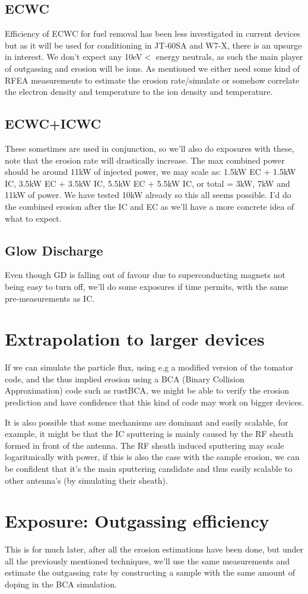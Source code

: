 \documentclass{article}
\begin{document}
\subsection{ECWC}
Efficiency of ECWC for fuel removal has been less investigated in current
devices but as it will be used for conditioning in JT-60SA and W7-X, there is
an upsurge in interest. We don't expect any 10eV$<$ energy neutrals, as such
the main player of outgassing and erosion will be ions.  As mentioned we either
need some kind of RFEA measurements to estimate the erosion rate/simulate or somehow
correlate the electron density and temperature to the ion density and
temperature.
\subsection{ECWC+ICWC}
These sometimes are used in conjunction, so we'll also do exposures with these,
note that the erosion rate will drastically increase. The max combined power
should be around 11kW of injected power, we may scale as: 1.5kW EC + 1.5kW IC,
3.5kW EC + 3.5kW IC, 5.5kW EC + 5.5kW IC, or total = 3kW, 7kW and 11kW of
power. We have tested 10kW already so this all seems possible.  I'd do the
combined erosion after the IC and EC as we'll have a more concrete idea of what
to expect.
\subsection{Glow Discharge}
Even though GD is falling out of favour due to superconducting magnets not
being easy to turn off, we'll do some exposures if time permits, with the same
pre-measurements as IC.
\section{Extrapolation to larger devices}
If we can simulate the particle flux, using e.g a modified version of the
tomator code, and the thus implied erosion using a BCA (Binary Collision
Approximation) code such as rustBCA, we might be able to verify the erosion
prediction and have confidence that this kind of code may work on
bigger devices.

It is also possible that some mechanisms are dominant and easily scalable, for
example, it might be that the IC sputtering is mainly caused by the RF sheath
formed in front of the antenna.  The RF sheath induced sputtering may scale
logaritmically with power, if this is also the case with the sample erosion, we
can be confident that it's the main sputtering candidate and thus easily
scalable to other antenna's (by simulating their sheath).

\section{Exposure: Outgassing efficiency}
This is for much later, after all the erosion estimations have been done, but
under all the previously mentioned techniques, we'll use the same measurements
and estimate the outgassing rate by constructing a sample with the same amount
of doping in the BCA simulation.



\end{document}

